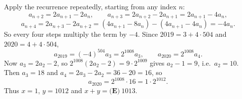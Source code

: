 Apply the recurrence repeatedly, starting from any index $n$:
\[
a_{n+2}=2a_{n+1}-2a_n,\qquad a_{n+3}=2a_{n+2}-2a_{n+1}=2a_{n+1}-4a_n,
\]
\[
a_{n+4}=2a_{n+3}-2a_{n+2}=(4a_{n+1}-8a_n)-(4a_{n+1}-4a_n)=-4a_n .
\]
So every four steps multiply the term by $-4$. Since $2019=3+4\cdot504$ and $2020=4+4\cdot504$,
\[
a_{2019}=(-4)^{504}a_3=2^{1008}a_3,\qquad a_{2020}=2^{1008}a_4 .
\]
Now $a_3=2a_2-2$, so $2^{1008}(2a_2-2)=9\cdot2^{1009}$ gives $a_2-1=9$, i.e.\ $a_2=10$. Then $a_3=18$ and $a_4=2a_3-2a_2=36-20=16$, so
\[
a_{2020}=2^{1008}\cdot16=1\cdot2^{1012}.
\]
Thus $x=1$, $y=1012$ and $x+y=\boxed{\textbf{(E)}\ 1013}$.
